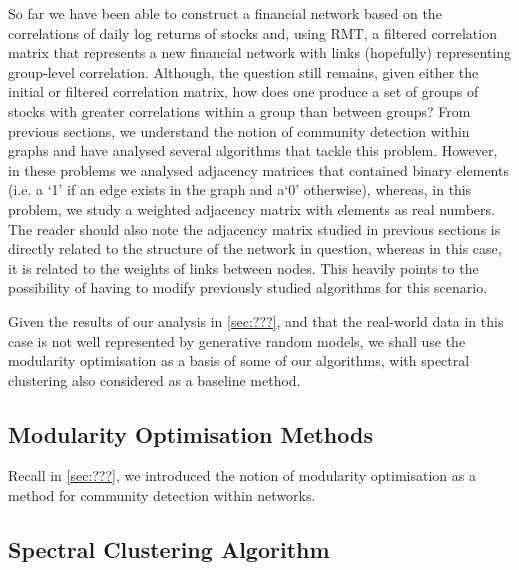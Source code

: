 So far we have been able to construct a financial network based on the correlations of daily log returns of stocks and, using RMT, a filtered correlation matrix that represents a new financial network with links (hopefully) representing group-level correlation.
Although, the question still remains, given either the initial or filtered correlation matrix, how does one produce a set of groups of stocks with greater correlations within a group than between groups?
From previous sections, we understand the notion of community detection within graphs and have analysed several algorithms that tackle this problem. However, in these problems we analysed adjacency matrices that contained binary elements (i.e. a `1' if an edge exists in the graph and a`0' otherwise), whereas, in this problem, we study a weighted adjacency matrix with elements as real numbers.
The reader should also note the adjacency matrix studied in previous sections is directly related to the structure of the network in question, whereas in this case, it is related to the weights of links between nodes.
This heavily points to the possibility of having to modify previously studied algorithms for this scenario.

Given the results of our analysis in \cref{sec:???}, and that the real-world data in this case is not well represented by generative random models, we shall use the modularity optimisation as a basis of some of our algorithms, with spectral clustering also considered as a baseline method. 


\subsection{Modularity Optimisation Methods}
\label{subsec:modularityOptimisationMethods}

Recall in \cref{sec:???}, we introduced the notion of modularity optimisation as a method for community detection within networks.


\subsection{Spectral Clustering Algorithm}
\label{subsec:spectralClusteringAlgorithm}

